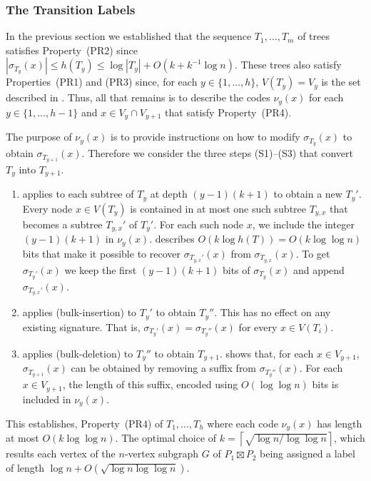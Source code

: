 \documentclass[kpfonts]{patmorin}
\begin{document}
\subsubsection{The Transition Labels}

In the previous section we established that the sequence $T_1,\ldots,T_m$ of trees satisfies Property~(PR2) since $|\sigma_{T_y}(x)|\le h(T_y)\le \log |T_y|+O(k+k^{-1}\log n)$.  These trees also satisfy Properties~(PR1) and (PR3) since, for each $y\in\{1,\ldots,h\}$, $V(T_y)=V_y$ is the set described in .  Thus, all that remains is to describe the codes $\nu_y(x)$ for each $y\in\{1,\ldots,h-1\}$ and $x\in V_y\cap V_{y+1}$ that satisfy Property~(PR4).

The purpose of $\nu_y(x)$ is to provide instructions on how to modify $\sigma_{T_y}(x)$ to obtain $\sigma_{T_{y+1}}(x)$.  Therefore we consider the three steps (S1)--(S3) that convert $T_y$ into $T_{y+1}$.  
\begin{enumerate}[(S1)]
  \item applies  to each subtree of $T_y$ at depth $(y-1)(k+1)$ to obtain a new $T_y'$.  Every node $x\in V(T_y)$ is contained in at most one such subtree $T_{y,x}$ that becomes a subtree $T_{y,x}'$ of $T_y'$.  For each such node $x$, we include the integer $(y-1)(k+1)$ in $\nu_y(x)$.  describes $O(k\log h(T))=O(k\log\log n)$ bits that make it possible to recover $\sigma_{T_{y,x}'}(x)$ from $\sigma_{T_{y,x}}(x)$.  To get $\sigma_{T_y'}(x)$ we keep the first $(y-1)(k+1)$ bits of $\sigma_{T_y}(x)$ and append $\sigma_{T_{y,x}'}(x)$.
  
  \item applies  (bulk-insertion) to $T_{y}'$ to obtain $T_{y}''$.  This has no effect on any existing signature.  That is, $\sigma_{T_y'}(x)=\sigma_{T_{y}''}(x)$ for every $x\in V(T_i)$.
  
  \item applies  (bulk-deletion) to $T_{y}''$ to obtain $T_{y+1}$.  shows that, for each $x\in V_{y+1}$, $\sigma_{T_{y+1}}(x)$ can be obtained by removing a suffix from $\sigma_{T_y''}(x)$.  For each $x\in V_{y+1}$, the length of this suffix, encoded using $O(\log\log n)$ bits is included in $\nu_{y}(x)$.
\end{enumerate}

This establishes, Property~(PR4) of $T_1,\ldots,T_h$ where each code $\nu_y(x)$ has length at most $O(k\log\log n)$. The optimal choice of $k=\left\lceil\sqrt{\log n/\log\log n}\right\rceil$, which results each vertex of the $n$-vertex subgraph $G$ of $P_1\boxtimes P_2$ being assigned a label of length $\log n + O(\sqrt{\log n\log\log n})$.
\end{document}
